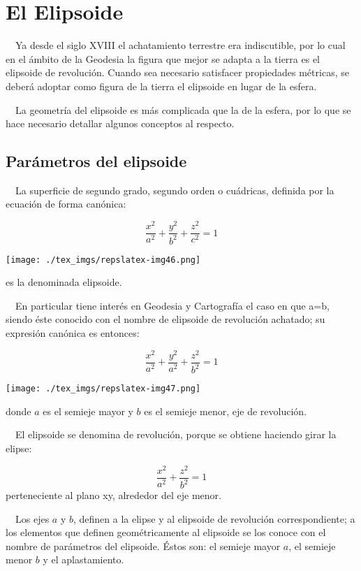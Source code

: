 \documentclass[]{article}
\date{}
\begin{document}
\hypertarget{el-elipsoide}{%
\section{El Elipsoide}\label{el-elipsoide}}

~~Ya desde el siglo XVIII el achatamiento terrestre era indiscutible,
por lo cual en el ámbito de la Geodesia la figura que mejor se adapta a
la tierra es el elipsoide de revolución. Cuando sea necesario satisfacer
propiedades métricas, se deberá adoptar como figura de la tierra el
elipsoide en lugar de la esfera.

~~La geometría del elipsoide es más complicada que la de la esfera, por
lo que se hace necesario detallar algunos conceptos al respecto.

\hypertarget{paruxe1metros-del-elipsoide}{%
\subsection*{Parámetros del
elipsoide}\label{paruxe1metros-del-elipsoide}}

~~La superficie de segundo grado, segundo orden o cuádricas, definida
por la ecuación de forma canónica:

\[{\frac{x^{{2}}}{a^{{2}}}+\frac{y^{{2}}}{b^{{2}}}+\frac{z^{{2}}}{c^{{2}}}=1}\]

\texttt{[image: ./tex\_imgs/repslatex-img46.png]}

es la denominada elipsoide.

~~En particular tiene interés en Geodesia y Cartografía el caso en que
a=b, siendo éste conocido con el nombre de elipsoide de revolución
achatado; su expresión canónica es entonces:

\[{\frac{x^2}{a^2}+\frac{y^2}{a^2}+\frac{z^2}{b^2}=1}\]

\texttt{[image: ./tex\_imgs/repslatex-img47.png]}

donde \(a\) es el semieje mayor y \(b\) es el semieje menor, eje de
revolución.

~~El elipsoide se denomina de revolución, porque se obtiene haciendo
girar la elipse:

\[{\frac{x^{{2}}}{a^{{2}}}+\frac{z^{{2}}}{b^{{2}}}=1}\] perteneciente al
plano xy, alrededor del eje menor.

~~Los ejes \(a\) y \(b\), definen a la elipse y al elipsoide de
revolución correspondiente; a los elementos que definen geométricamente
al elipsoide se los conoce con el nombre de parámetros del elipsoide.
Éstos son: el semieje mayor \(a\), el semieje menor \(b\) y el
aplastamiento.
\end{document}
